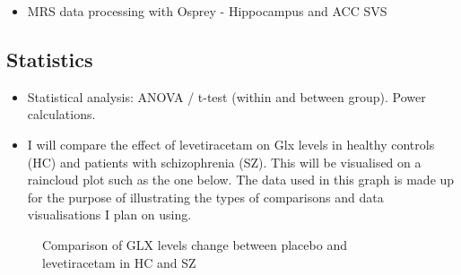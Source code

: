 \documentclass[
  letterpaper,
  DIV=11,
  numbers=noendperiod]{scrartcl}
\providecommand{\tightlist}{%
  \setlength{\itemsep}{0pt}\setlength{\parskip}{0pt}}\usepackage{longtable,booktabs,array}
\begin{document}
\begin{itemize}
\tightlist
\item
  MRS data processing with Osprey - Hippocampus and ACC SVS
\end{itemize}

\subsection{Statistics}\label{statistics}

\begin{itemize}
\tightlist
\item
  Statistical analysis: ANOVA / t-test (within and between group). Power
  calculations.
\item
  I will compare the effect of levetiracetam on Glx levels in healthy
  controls (HC) and patients with schizophrenia (SZ). This will be
  visualised on a raincloud plot such as the one below. The data used in
  this graph is made up for the purpose of illustrating the types of
  comparisons and data visualisations I plan on using.
\end{itemize}

\begin{figure}[H]


\caption{\label{fig-lev_hc_vs_sz}Comparison of GLX levels change between
placebo and levetiracetam in HC and SZ}

\end{figure}%
\end{document}
